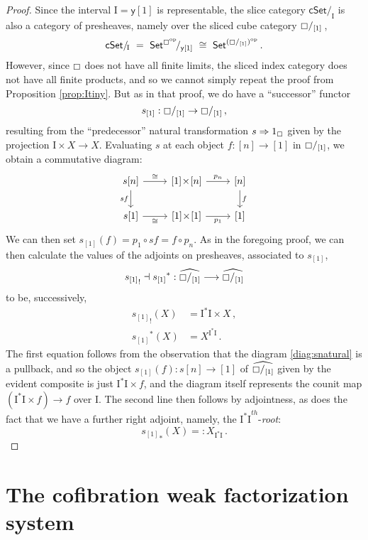 \documentclass[11pt,reqno]{amsart}
\newcommand{\C}{\ensuremath{\boxempty}}
\newcommand{\psh}[1]{\ensuremath{\mathsf{Set}^{#1^{\mathrm{op}}}}}
\newcommand{\cSet}{\ensuremath{\mathsf{cSet}}}
\newcommand{\slice}[1]{\ensuremath{/_{\!{#1}}}}
\newcommand{\y}{\ensuremath{\mathsf{y}}} %
\renewcommand{\to}{\ensuremath{\rightarrow}}
\newcommand{\too}{\ensuremath{\longrightarrow}}
\newcommand{\I}{\ensuremath{\mathrm{I}}}
\theoremstyle{remark}
\theoremstyle{definition}
\begin{document}
\begin{proof}
Since the interval $\I = \y[1]$ is representable, the slice category $\cSet\slice{\I}$ is also a category of presheaves, namely over the sliced cube category $\C/_{[1]}$\,,
\[
\cSet\slice{\I} \ =\ {\psh{\C}}\!/_{\y[1]} \ \cong\ \psh{ (\C/_{[1]}) }\,.
\]
However, since $\C$ does not have all finite limits, the sliced index category does not have all finite products, and so we cannot simply repeat the proof from Proposition \ref{prop:Itiny}.  But as in that proof, we do have a ``successor'' functor 
\[
s_{[1]} : \C/_{[1]} \to \C/_{[1]}\,,
\]
resulting from the ``predecessor'' natural transformation $s \Rightarrow 1_\C$ given by the  projection $\I\times X \to X$. Evaluating $s$ at each object $f : [n] \to [1]$ in  $\C/_{[1]}$, we obtain a commutative diagram:
\begin{equation}\label{diag:snatural}
\begin{tikzcd}
s[n]  \ar[d,swap, "{sf}"] \ar[r, "{\cong}" ] & {[1]}\!\times\! {[n]}  \ar[r, "p_n"] & {[n]} \ar[d, "f"] \\  
s[1]  \ar[r, swap, "{\cong}" ] & {[1]}\!\times\! {[1]}  \ar[r, swap, "p_1"] & {[1]}
 \end{tikzcd}
 \end{equation}
We can then set $s_{[1]}(f) = p_1\circ sf = f\circ p_n$. As in the foregoing proof, we can then calculate the values of the adjoints on presheaves, associated to $s_{[1]}$,
 \[
 {s_{[1]}}_! \dashv {s_{[1]}}^* : \widehat{\C/_{[1]}} \too \widehat{\C/_{[1]}} \]
  to be, successively,
 \begin{align*}
 {s_{[1]}}_! (X) &= \I^*\I \times X\,, \\
  {s_{[1]}}^* (X) &= X^{\I^*\I} \,.
 \end{align*}
The first equation follows from the observation that the diagram \eqref{diag:snatural} is a pullback, and so the object $s_{[1]}(f)  : s[n]\to [1]$ of $\widehat{\C/_{[1]}}$ given by the evident composite is just $\I^*\I \times f $, and the diagram itself represents the counit map $(\I^*\I \times f) \to f$ over $\I$.
 The second line then follows by adjointness, as does the fact that we have a further right adjoint, namely, the ${\I^*\I}^{th}$-\emph{root}:
 \begin{equation*}
 {s_{[1]}}_* (X) =: X_{\I^*\I} \,.
 \end{equation*}
\end{proof}

\section{The cofibration weak factorization system}\label{sec:cofibrations}
%
%
\end{document}
